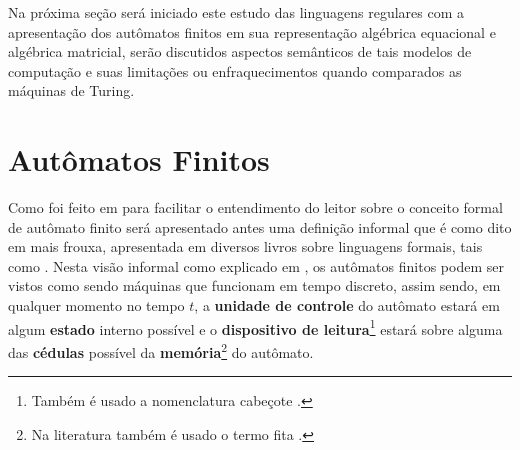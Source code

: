 Na próxima seção será iniciado este estudo das linguagens regulares com a apresentação dos autômatos finitos em sua representação algébrica equacional e  algébrica matricial, serão discutidos aspectos semânticos de tais modelos de computação e suas limitações ou enfraquecimentos quando comparados as máquinas de Turing.

\section{Autômatos Finitos}

Como foi feito em \cite{valdi2016master, valdi2020phd} para facilitar o entendimento do leitor sobre o conceito formal de autômato finito será apresentado antes uma definição informal que é como dito em \cite{valdi2016master} mais frouxa, apresentada em diversos livros sobre linguagens formais, tais como \cite{benjaLivro2010, hopcroft2008, linz2006}. Nesta visão informal como explicado em \cite{benjaLivro2010}, os autômatos finitos podem ser vistos como sendo máquinas que funcionam em tempo discreto, assim sendo, em qualquer momento  no tempo $t$, a \textbf{unidade de controle} do autômato estará em algum \textbf{estado} interno possível e o \textbf{dispositivo de leitura}\footnote{Também é usado a nomenclatura cabeçote \cite{valdi2020phd, valdi2016master}.}  estará sobre alguma das \textbf{cédulas} possível da \textbf{memória}\footnote{Na literatura também é usado o termo fita \cite{valdi2020phd, menezes1998LFA}.} do autômato. 

